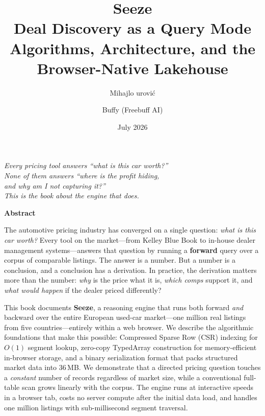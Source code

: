 \documentclass[11pt,a4paper,twoside]{book}
\title{\Huge\textbf{Seeze}\\[\baselineskip]
       \Large Deal Discovery as a Query Mode\\[4pt]
       \large Algorithms, Architecture, and the Browser-Native Lakehouse}
\author{Mihajlo \DJ{}urovi\'{c} \and Buffy (Freebuff AI)}
\date{July 2026}
\begin{document}
\maketitle

\thispagestyle{empty}
\vspace*{\fill}
\begin{center}
    \textit{Every pricing tool answers ``what is this car worth?''}\\
    \textit{None of them answers ``where is the profit hiding,}\\
    \textit{and why am I not capturing it?''}\\[12pt]
    \textit{This is the book about the engine that does.}
\end{center}
\vspace*{\fill}

\newpage
\thispagestyle{empty}
\vspace*{4cm}
\begin{center}
{\Large\textbf{Abstract}}\\[16pt]
\end{center}

The automotive pricing industry has converged on a single question: \textit{what is this car worth?}
Every tool on the market---from Kelley Blue Book to in-house dealer management systems---answers
that question by running a \textbf{forward} query over a corpus of comparable listings. The answer
is a number. But a number is a conclusion, and a conclusion has a derivation. In practice, the
derivation matters more than the number: \textit{why} is the price what it is, \textit{which comps}
support it, and \textit{what would happen} if the dealer priced differently?

This book documents \textbf{Seeze}, a reasoning engine that runs both forward \emph{and} backward
over the entire European used-car market---one million real listings from five countries---entirely
within a web browser. We describe the algorithmic foundations that make this possible: Compressed
Sparse Row (CSR) indexing for $O(1)$ segment lookup, zero-copy TypedArray construction for
memory-efficient in-browser storage, and a binary serialization format that packs structured market
data into 36\,MB. We demonstrate that a directed pricing question touches a \emph{constant} number
of records regardless of market size, while a conventional full-table scan grows linearly with the
corpus. The engine runs at interactive speeds in a browser tab, costs no server compute after the
initial data load, and handles one million listings with sub-millisecond segment traversal.
\end{document}
